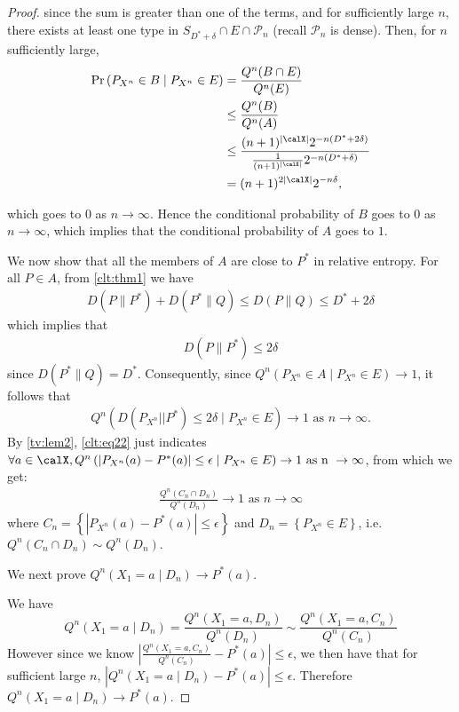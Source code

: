 \documentclass{article}
\newcommand{\typss}{\mathcal{P}_n}
\begin{document}
\begin{proof}
since the sum is greater than one of the terms, and for sufficiently large $n$, there exists at least one type in $S_{D^{*}+\delta} \cap E \cap \typss$ (recall  $\typss$ is dense). Then, for $n$ sufficiently large,
\begin{align*}
\begin{aligned}
\operatorname{Pr}\left(P_{X^{n}} \in B \mid P_{X^{n}} \in E\right) &=\frac{Q^{n}(B \cap E)}{Q^{n}(E)} \\
& \leq \frac{Q^{n}(B)}{Q^{n}(A)} \\
& \leq \frac{(n+1)^{| \calX |} 2^{-n\left(D^{*}+2 \delta\right)}}{\frac{1}{(n+1)^{| \calX |}} 2^{-n\left(D^{*}+\delta\right)}} \\
&=(n+1)^{2| \calX |} 2^{-n \delta},
\end{aligned}
\end{align*}


which goes to 0 as $n \rightarrow \infty$. Hence the conditional probability of $B$ goes to 0 as $n \rightarrow \infty$, which implies that the conditional probability of $A$ goes to $1 .$

We now show that all the members of $A$ are close to $P^{*}$ in relative entropy. For all  $P\in A$, from \cref{clt:thm1} we have
\begin{align*}
D\left(P \| P^{*}\right)+D\left(P^{*} \| Q\right) \leq D(P \| Q) \leq D^{*}+2 \delta
\end{align*}
which implies that
\begin{align*}
D\left(P \| P^{*}\right) \leq 2 \delta
\end{align*}
since $D\left(P^{*} \| Q\right)=D^{*}$.  Consequently, since $Q^n\left(P_{X^{n}} \in A \mid P_{X^{n}}\in E\right) \rightarrow 1$, it follows that
\begin{align}
Q^n\left(D\left(P_{X^{n}}|| P^{*}\right) \leq 2 \delta \mid P_{X^{n}} \in E\right) \rightarrow 1 \text{ as $n \rightarrow \infty$.} \label{clt:eq22}
\end{align}
 By \cref{tv:lem2}, \cref{clt:eq22} just indicates $\forall a\in \calX, Q^n\left(\left|P_{X^{n}}(a)-P^{*}(a)\right| \le \epsilon \mid P_{X^{n}} \in E\right) \rightarrow 1 \text{ as n } \rightarrow \infty$, from which we get:
 \begin{align}
     \frac{Q^n(C_n\cap D_n)}{Q^n(D_n)} \rightarrow 1 \text{ as } n \rightarrow \infty
 \end{align}
 where $C_n=\left\{ \left|P_{X^{n}}(a)-P^{*}(a)\right| \le \epsilon \right\}$ and $D_n = \left\{P_{X^{n}} \in E \right\}$, i.e. $Q^n(C_n\cap D_n) \sim Q^n(D_n) $.
 
 We next prove $Q^n\left(X_{1}=a \mid D_n\right) \rightarrow P^{*}(a)$.
 
 We have
 $$Q^n\left(X_{1}=a \mid D_n\right) = \frac{Q^n\left(X_{1}=a, D_n\right)}{Q^n\left(D_n\right)} \sim \frac{Q^n\left(X_{1}=a, C_n\right)}{Q^n\left(C_n\right)}$$
However since we know $|\frac{Q^n\left(X_{1}=a, C_n\right)}{Q^n\left(C_n\right)} -P^*(a) |\le \epsilon$, we then have that for sufficient large $n$, $|Q^n\left(X_{1}=a \mid D_n\right) -P^*(a) |\le \epsilon$. Therefore $Q^n\left(X_{1}=a \mid D_n\right) \rightarrow P^{*}(a)$.



\end{proof}
\end{document}
